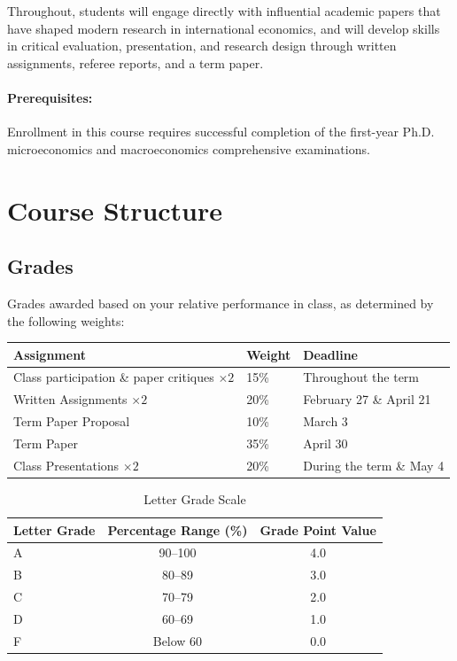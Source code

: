\documentclass[10pt]{article}
\newcommand{\ra}[1]{\renewcommand{\arraystretch}{#1}}
\begin{document}
Throughout, students will engage directly with influential academic papers that have shaped modern research in international economics, and will develop skills in critical evaluation, presentation, and research design through written assignments, referee reports, and a term paper.

\paragraph{Prerequisites:} Enrollment in this course requires successful completion of the first-year Ph.D. microeconomics and macroeconomics comprehensive examinations.


\section*{Course Structure}

\subsection*{Grades}

Grades awarded based on your relative performance in class, as determined by the following weights:
\begin{table}[!h]
    \ra{1.2}
    \centering
    \begin{tabular}{@{\extracolsep{1cm}}lll@{}}
        \textbf{Assignment} & \textbf{Weight} & \textbf{Deadline} \\
        \midrule
        Class participation \& paper critiques $\times 2$ & 15\% &  Throughout the term \\
        Written Assignments $\times 2$ & 20\% &  February 27 \& April 21 \\
        Term Paper Proposal & 10\% & March 3 \\
        Term Paper & 35\% & April 30 \\
        Class Presentations $\times 2$ & 20\% &  During the term \& May 4  \\
    \end{tabular}
\end{table}

  
  \begin{table}[h!]
\centering
\caption{Letter Grade Scale}
\begin{tabular}{lcc}
\toprule
\textbf{Letter Grade} & \textbf{Percentage Range (\%)} & \textbf{Grade Point Value} \\
\midrule
A  & 90--100  & 4.0 \\
B  & 80--89   & 3.0 \\
C  & 70--79   & 2.0 \\
D  & 60--69   & 1.0 \\
F  & Below 60 & 0.0 \\
\bottomrule
\end{tabular}
\end{table}
  
\end{document}
